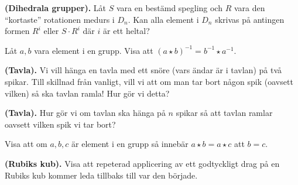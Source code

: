 \documentclass[11pt,fleqn]{book} %
\begin{document}
\begin{problem} \textbf{(Dihedrala grupper).}
  Låt \(S\) vara en bestämd spegling och \(R\) vara den ``kortaste'' rotationen medurs i \(D_n\). Kan alla element i \(D_n\) skrivas på antingen formen \(R ^i \) eller \(S  \cdot R ^{i}\) där \(i\) är ett heltal?
\end{problem}

\begin{problem} Låt \(a, b\) vara element i en grupp. Visa att \((a  \star b) ^{-1} = b ^{-1} \star a ^{-1}\).
\end{problem}

\begin{problem} \textbf{(Tavla).}
 Vi vill hänga en tavla med ett snöre (vars ändar är i tavlan) på två spikar. Till skillnad från vanligt, vill vi att om man tar bort någon spik (oavsett vilken) så ska tavlan ramla! Hur gör vi detta? %
\end{problem}

\begin{problem} \textbf{(Tavla).}
  Hur gör vi om tavlan ska hänga på \(n\) spikar så att tavlan ramlar oavsett vilken spik vi tar bort?
\end{problem}

% 


\begin{problem}
  Visa att om \(a, b, c\) är element i en grupp så innebär \(a  \star b = a  \star c\) att \(b = c\).
\end{problem}

\begin{problem} \textbf{(Rubiks kub).}
  Visa att repeterad applicering av ett godtyckligt drag på en Rubiks kub kommer leda tillbaks till var den började.
\end{problem}
\end{document}
